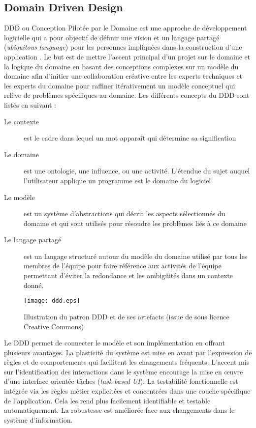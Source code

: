 \subsection{Domain Driven Design}
	
	\gls{DDD} ou Conception Pilotée par le Domaine est une 
	approche de 
	développement logicielle qui a pour objectif de définir une vision et un 
	langage partagé (\textit{ubiquitous language}) pour les personnes 
	impliquées dans la construction d'une application \cite{Evans2003}.
	Le but est de mettre l'accent principal d'un projet sur le domaine et la logique du 
	domaine en basant des conceptions complexes sur un modèle du domaine afin 
	d'initier une collaboration créative entre les experts techniques et les experts du 
	domaine pour raffiner itérativement un modèle conceptuel qui relève de 
	problèmes spécifiques au domaine.
	Les différents concepts du \gls{DDD} sont listés en suivant :
	\begin{description}
		\item[Le contexte] est le cadre dans lequel un mot apparaît qui détermine sa 
		signification
		\item[Le domaine] est une ontologie, une influence, ou une activité. 
		L'étendue du sujet auquel l'utilisateur applique un programme est le domaine 
		du logiciel 
		\item[Le modèle] est un système d'abstractions qui décrit les aspects 
		sélectionnés du domaine et qui sont utilisés pour résoudre les problèmes liés 
		à ce domaine
		\item[Le langage partagé] est un langage structuré autour du modèle du 
		domaine utilisé par tous les membres de l'équipe pour faire référence aux 
		activités de l'équipe permettant d'éviter la redondance et les ambigüités dans 
		un contexte donné.
	\end{description}

\begin{figure}
	\noindent
	\centering
	\texttt{[image: ddd.eps]}
	\caption{Illustration du patron \gls{DDD} et de ses artefacts (issue de 
	\cite{Avram2006} sous licence Creative Commons)}
\label{fig:ddd}
\end{figure}

Le \gls{DDD} permet de connecter le modèle et son implémentation en offrant 
plusieurs avantages. La plasticité du système est mise en avant par l'expression 
de règles et de comportements qui facilitent les changements fréquents.
L'accent mis sur l'identification des interactions dans le système encourage la 
mise en \oe{}uvre d'une interface orientée tâches (\textit{task-based UI}).
La testabilité fonctionnelle est intégrée via les règles métier explicitées 
et concentrées dans une couche spécifique de l'application. Cela les rend 
plus facilement identifiable et testable automatiquement.
La robustesse est améliorée face aux changements dans le système d'information.

